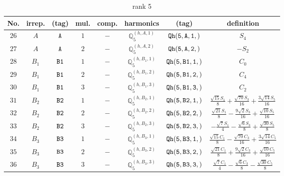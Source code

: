 \documentclass[fleqn,8pt]{jsarticle}
\begin{document}
\begin{table}[ht!]
\begin{center}
\caption{rank 5}
\renewcommand{\arraystretch}{1.3}
\begin{tabular}{cccccccc} \hline \hline
No. & irrep. & (tag) & mul. & comp. & harmonics & (tag) & definition \\ \hline
$ 26 $ & $ A $ & $ {\tt A} $ & $ 1 $ & $ - $ & $ \mathbb{Q}_{5}^{(h,A,1)} $ & $ {\tt Qh(5,A,1,)} $ & $ S_{4} $ \\
$ 27 $ & $ A $ & $ {\tt A} $ & $ 2 $ & $ - $ & $ \mathbb{Q}_{5}^{(h,A,2)} $ & $ {\tt Qh(5,A,2,)} $ & $ - S_{2} $ \\
$ 28 $ & $ B_{1} $ & $ {\tt B1} $ & $ 1 $ & $ - $ & $ \mathbb{Q}_{5}^{(h,B_{1},1)} $ & $ {\tt Qh(5,B1,1,)} $ & $ C_{0} $ \\
$ 29 $ & $ B_{1} $ & $ {\tt B1} $ & $ 2 $ & $ - $ & $ \mathbb{Q}_{5}^{(h,B_{1},2)} $ & $ {\tt Qh(5,B1,2,)} $ & $ C_{4} $ \\
$ 30 $ & $ B_{1} $ & $ {\tt B1} $ & $ 3 $ & $ - $ & $ \mathbb{Q}_{5}^{(h,B_{1},3)} $ & $ {\tt Qh(5,B1,3,)} $ & $ C_{2} $ \\
$ 31 $ & $ B_{2} $ & $ {\tt B2} $ & $ 1 $ & $ - $ & $ \mathbb{Q}_{5}^{(h,B_{2},1)} $ & $ {\tt Qh(5,B2,1,)} $ & $ \frac{\sqrt{15} S_{1}}{8} + \frac{\sqrt{70} S_{3}}{16} + \frac{3 \sqrt{14} S_{5}}{16} $ \\
$ 32 $ & $ B_{2} $ & $ {\tt B2} $ & $ 2 $ & $ - $ & $ \mathbb{Q}_{5}^{(h,B_{2},2)} $ & $ {\tt Qh(5,B2,2,)} $ & $ \frac{\sqrt{21} S_{1}}{8} - \frac{9 \sqrt{2} S_{3}}{16} + \frac{\sqrt{10} S_{5}}{16} $ \\
$ 33 $ & $ B_{2} $ & $ {\tt B2} $ & $ 3 $ & $ - $ & $ \mathbb{Q}_{5}^{(h,B_{2},3)} $ & $ {\tt Qh(5,B2,3,)} $ & $ - \frac{\sqrt{7} S_{1}}{4} - \frac{\sqrt{6} S_{3}}{8} + \frac{\sqrt{30} S_{5}}{8} $ \\
$ 34 $ & $ B_{3} $ & $ {\tt B3} $ & $ 1 $ & $ - $ & $ \mathbb{Q}_{5}^{(h,B_{3},1)} $ & $ {\tt Qh(5,B3,1,)} $ & $ \frac{\sqrt{15} C_{1}}{8} - \frac{\sqrt{70} C_{3}}{16} + \frac{3 \sqrt{14} C_{5}}{16} $ \\
$ 35 $ & $ B_{3} $ & $ {\tt B3} $ & $ 2 $ & $ - $ & $ \mathbb{Q}_{5}^{(h,B_{3},2)} $ & $ {\tt Qh(5,B3,2,)} $ & $ \frac{\sqrt{21} C_{1}}{8} + \frac{9 \sqrt{2} C_{3}}{16} + \frac{\sqrt{10} C_{5}}{16} $ \\
$ 36 $ & $ B_{3} $ & $ {\tt B3} $ & $ 3 $ & $ - $ & $ \mathbb{Q}_{5}^{(h,B_{3},3)} $ & $ {\tt Qh(5,B3,3,)} $ & $ \frac{\sqrt{7} C_{1}}{4} - \frac{\sqrt{6} C_{3}}{8} - \frac{\sqrt{30} C_{5}}{8} $ \\
 \hline \hline
\end{tabular}
\end{center}
\end{table}
\end{document}
